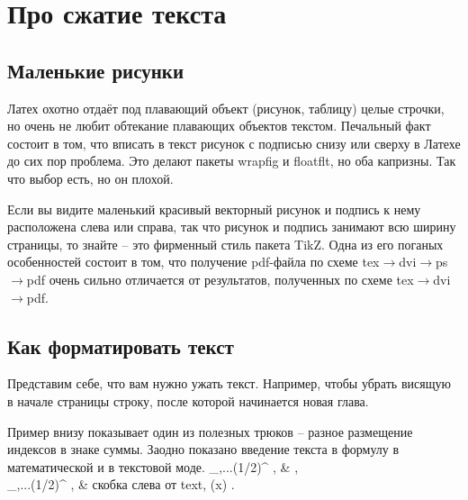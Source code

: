 \chapter{\label{ch:Chast1}Про сжатие текста}
\section{Маленькие рисунки}
\hs
   Латех охотно отдаёт под плавающий объект (рисунок, таблицу) целые строчки, но очень не любит обтекание плавающих объектов текстом.
   Печальный факт состоит в том, что вписать в текст рисунок с подписью
снизу или сверху в Латехе до сих пор проблема.
   Это делают пакеты wrapfig и floatflt, но оба капризны.
   Так что выбор есть, но он плохой.

   Если вы видите маленький красивый векторный рисунок и
подпись к нему расположена слева или справа,
так что рисунок и подпись занимают всю ширину страницы,
то знайте -- это фирменный стиль пакета TikZ.
   Одна из его поганых особенностей состоит в том, что получение pdf-файла
по схеме tex$\to$dvi$\to$ps$\to$pdf очень сильно отличается
от результатов, полученных по схеме tex$\to$dvi$\to$pdf.

\section{Как форматировать текст}
\hs
   Представим себе, что вам нужно ужать текст.
   Например, чтобы убрать висящую в начале страницы строку, после которой начинается новая глава.

   Пример внизу показывает один из полезных трюков -- разное размещение индексов в знаке суммы.
   Заодно показано введение текста в формулу в математической и в текстовой моде.
\BEA
   \sum_{,...}(1/2)^{\varkappa} , & ,\\
   \sum\nolimits_{,...}(1/2)^{\phi} ,   & {\text скобка слева от text, \tg(x) }.
\ENA

